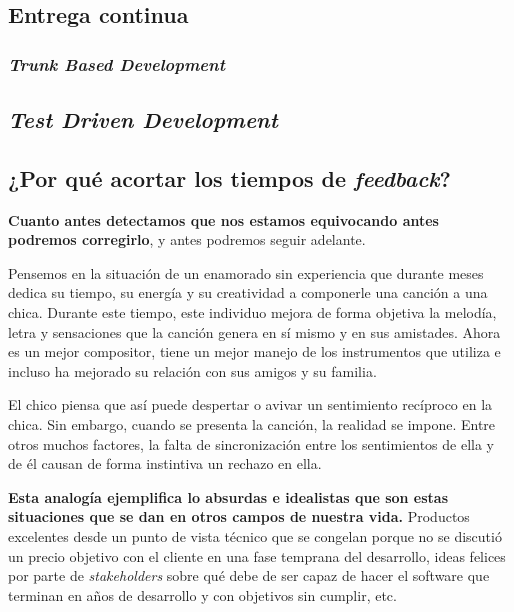 \subsection{Entrega continua}

\subsubsection{\textit{Trunk Based Development}}

\subsection{\textit{Test Driven Development}}




\subsection{¿Por qué acortar los tiempos de \textit{feedback}?}

\textbf{Cuanto antes detectamos que nos estamos equivocando
antes podremos corregirlo}, y antes podremos seguir adelante.

Pensemos en la situación de un enamorado sin experiencia que durante meses dedica su
tiempo, su energía y su creatividad a componerle una canción a una chica.
Durante este tiempo, este individuo mejora de forma objetiva la
melodía, letra y sensaciones que la canción genera en sí mismo
y en sus amistades. Ahora es un mejor compositor, tiene un mejor manejo
de los instrumentos que utiliza e incluso ha mejorado su
relación con sus amigos y su familia.

El chico piensa que así puede despertar o avivar un sentimiento recíproco
en la chica. Sin embargo, cuando se presenta la canción,
la realidad se impone. Entre otros muchos factores,
la falta de sincronización entre los sentimientos de ella y de él causan
de forma instintiva un rechazo en ella.

\textbf{Esta analogía ejemplifica lo absurdas e idealistas
que son estas situaciones que se dan en otros campos de nuestra vida.}
Productos excelentes desde un punto de vista técnico que se
congelan porque no se discutió un precio objetivo con
el cliente en una fase temprana del desarrollo, ideas felices
por parte de \textit{stakeholders} sobre qué debe de
ser capaz de hacer el software que terminan en años de desarrollo
y con objetivos sin cumplir, etc.

